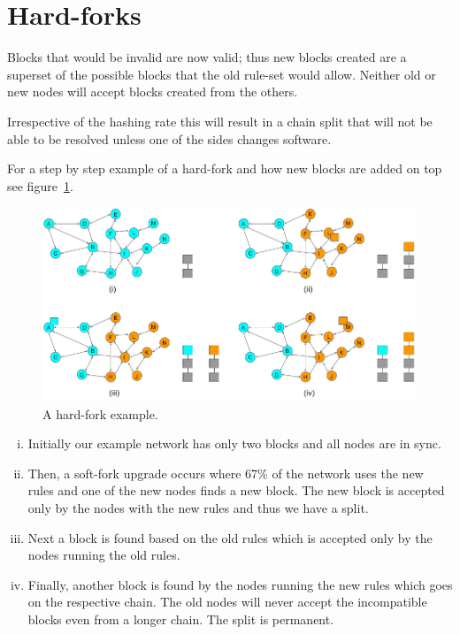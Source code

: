 \section{Hard-forks}
Blocks that would be invalid are now valid; thus new blocks created are a superset of the possible blocks that the old rule-set would allow. Neither old or new nodes will accept blocks created from the others.

Irrespective of the hashing rate this will result in a chain split that will not be able to be resolved unless one of the sides changes software.

For a step by step example of a hard-fork and how new blocks are added on top see figure~\ref{fig:hard-fork-example}.

\begin{figure}[h]
\begin{center}
\includegraphics[scale=0.4]{images/hard-fork-example}
\caption{A hard-fork example.}
\label{fig:hard-fork-example}
\end{center}
\end{figure}

\begin{enumerate}[(i)]
\item Initially our example network has only two blocks and all nodes are in sync.
\item Then, a soft-fork upgrade occurs where 67\% of the network uses the new rules and one of the new nodes finds a new block. The new block is accepted only by the nodes with the new rules and thus we have a split.
\item Next a block is found based on the old rules which is accepted only by the nodes running the old rules.
\item Finally, another block is found by the nodes running the new rules which goes on the respective chain. The old nodes will never accept the incompatible blocks even from a longer chain. The split is permanent.
\end{enumerate}



